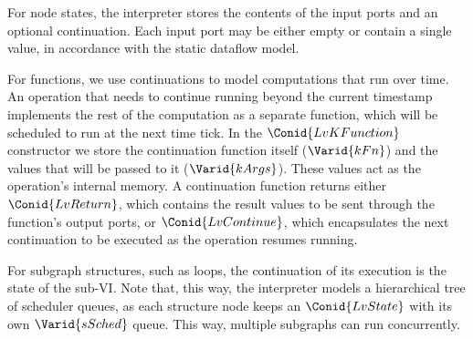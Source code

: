For node states, the interpreter stores the contents of the input ports and an
optional continuation. Each input port may be either empty or contain a single
value, in accordance with the static dataflow model.

\resethooks

For functions, we use continuations to model computations that run over time.
An operation that needs to continue running beyond the current timestamp
implements the rest of the computation as a separate function, which will be
scheduled to run at the next time tick. In the \ensuremath{\Conid{LvKFunction}} constructor we
store the continuation function itself (\ensuremath{\Varid{kFn}}) and the values that will be
passed to it (\ensuremath{\Varid{kArgs}}). These values act as the operation's internal memory.
A continuation function returns either \ensuremath{\Conid{LvReturn}}, which contains the result
values to be sent through the function's output ports, or \ensuremath{\Conid{LvContinue}}, which
encapsulates the next continuation to be executed as the operation resumes
running.

For subgraph structures, such as loops, the continuation of its execution is
the state of the sub-VI. Note that, this way, the interpreter models a
hierarchical tree of scheduler queues, as each structure node keeps an
\ensuremath{\Conid{LvState}} with its own \ensuremath{\Varid{sSched}} queue. This way, multiple subgraphs can run
concurrently.

